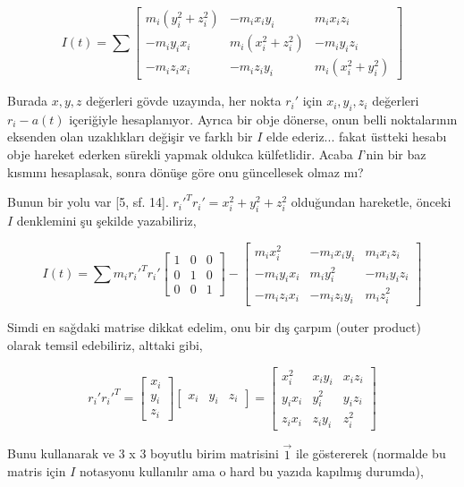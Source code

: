 \documentclass[12pt,fleqn]{article}\usepackage{../../common}
\begin{document}
$$
I(t) = \sum \left[\begin{array}{ccc}
m_i (y_i^2 + z_i^2) & -m_i x_i y_i & m_i x_i z_i \\
-m_i y_i x_i & m_i (x_i^2 + z_i^2) & -m_i y_i z_i \\
-m_i z_i x_i & -m_i z_i y_i & m_i (x_i^2 + y_i^2)
\end{array}\right]
$$

Burada $x,y,z$ değerleri gövde uzayında, her nokta $r_i'$ için $x_i,y_i,z_i$
değerleri $r_i - a(t)$ içeriğiyle hesaplanıyor. Ayrıca bir obje dönerse, onun
belli noktalarının eksenden olan uzaklıkları değişir ve farklı bir $I$ elde
ederiz... fakat üstteki hesabı obje hareket ederken sürekli yapmak oldukca
külfetlidir. Acaba $I$'nin bir baz kısmını hesaplasak, sonra dönüşe göre onu
güncellesek olmaz mı?

Bunun bir yolu var [5, sf. 14]. $r_i'^T r_i' = x_i^2 + y_i^2 + z_i^2$ olduğundan
hareketle, önceki $I$ denklemini şu şekilde yazabiliriz,

$$
I(t) = \sum
m_i r_i'^T r_i' \left[\begin{array}{ccc}
1 & 0 & 0 \\ 
0 & 1 & 0 \\ 
0 & 0 & 1 
\end{array}\right] -
\left[\begin{array}{ccc}
m_i x_i^2 & -m_i x_i y_i & m_i x_i z_i \\
-m_i y_i x_i & m_i y_i^2 & -m_i y_i z_i \\
-m_i z_i x_i & -m_i z_i y_i & m_i z_i^2
\end{array}\right]
$$

Simdi en sağdaki matrise dikkat edelim, onu bir dış çarpım (outer product)
olarak temsil edebiliriz, alttaki gibi,

$$
r_i' r_i'^T = \left[\begin{array}{c}
x_i \\ y_i \\ z_i
\end{array}\right]
\left[\begin{array}{ccc}
x_i & y_i & z_i
\end{array}\right] =
\left[\begin{array}{ccc}
x_i^2 &  x_i y_i &  x_i z_i \\
y_i x_i & y_i^2 & y_i z_i \\
z_i x_i & z_i y_i & z_i^2
\end{array}\right]
$$

Bunu kullanarak ve 3 x 3 boyutlu birim matrisini $\vec{1}$ ile göstererek
(normalde bu matris için $I$ notasyonu kullanılır ama o hard bu yazıda
kapılmış durumda),
\end{document}
